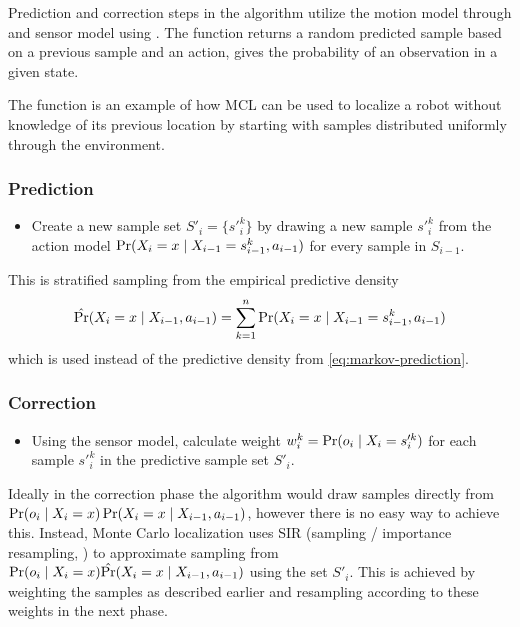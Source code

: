 Prediction and correction steps in the algorithm utilize the motion
model through \sampleFromActionModel{} and sensor model using \observationProbability{}.
The function \sampleFromActionModel{} returns a random predicted sample based on a previous sample and an action,
\observationProbability{} gives the probability of an observation in a given state.

The \initialize{} function is an example of how MCL can be used to localize
a robot without knowledge of its previous location by starting with samples distributed
uniformly through the environment.

\subsubsection{Prediction}
\begin{itemize}
\item
Create a new sample set \(S'_i = \{s'^k_{i}\} \)
by drawing a new sample \(s'^k_{i}\)
from the action model \(\operatorname{\mathrm{Pr}}(X_i = x \mid X_{i-1} = s^k_{i-1}, a_{i - 1})\)
for every sample in \(S_{i-1}\).
\end{itemize}

This is stratified sampling from the empirical predictive density
\begin{equation}
	\label{eq:mcl-predictive-density}
	\hat{\operatorname{\mathrm{Pr}}}(X_i = x \mid X_{i - 1}, a_{i - 1}) =
	\sum_{k = 1}^n \operatorname{\mathrm{Pr}}(X_i = x \mid X_{i-1} = s^k_{i-1}, a_{i - 1})
\end{equation}
which is used instead of the predictive density from \eqref{eq:markov-prediction}.

\subsubsection{Correction}
\begin{itemize}
\item
Using the sensor model, calculate weight \(w^k_i = \operatorname{\mathrm{Pr}}(o_i \mid X_i = s'^k_i)\)
for each sample \(s'^k_i\) in the predictive sample set \(S'_i\).
\end{itemize}

Ideally in the correction phase the algorithm would draw samples directly from
\(\operatorname{\mathrm{Pr}}(o_i \mid X_i = x) \operatorname{\mathrm{Pr}}(X_i = x \mid X_{i - 1}, a_{i - 1})\),
however there is no easy way to achieve this.
Instead, Monte Carlo localization 
uses SIR (sampling / importance resampling, \cite{smith92})
to approximate sampling from
\(\operatorname{\mathrm{Pr}}(o_i \mid X_i = x) \hat{\operatorname{\mathrm{Pr}}}(X_i = x \mid X_{i - 1}, a_{i - 1})\) using the set \(S'_i\).
This is achieved by weighting the samples as described earlier and resampling
according to these weights in the next phase.

